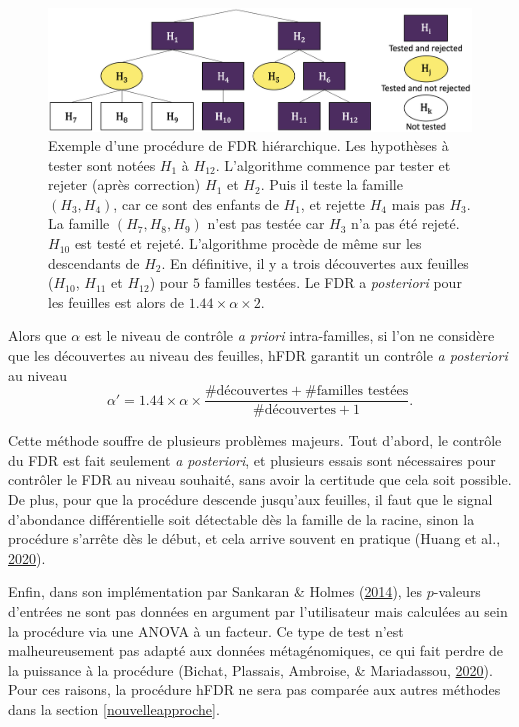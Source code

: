 \documentclass[12pt,a4paper]{reedthesis}
\theoremstyle{definition}
\theoremstyle{definition}
\theoremstyle{definition}
\theoremstyle{remark}
\begin{document}
\begin{figure}

{\centering \includegraphics[width=0.9\linewidth]{img/hfdr} 

}

\caption{Exemple d'une procédure de FDR hiérarchique. Les hypothèses à tester sont notées \(H_1\) à \(H_{12}\). L'algorithme commence par tester et rejeter (après correction) \(H_1\) et \(H_2\). Puis il teste la famille \((H_3, H_4)\), car ce sont des enfants de \(H_1\), et rejette \(H_4\) mais pas \(H_3\). La famille \((H_7, H_8, H_9)\) n'est pas testée car \(H_3\) n'a pas été rejeté. \(H_{10}\) est testé et rejeté. L'algorithme procède de même sur les descendants de \(H_2\). En définitive, il y a trois découvertes aux feuilles (\(H_{10}\), \(H_{11}\) et \(H_{12}\)) pour \(5\) familles testées. Le FDR a \emph{posteriori} pour les feuilles est alors de \(1.44 \times \alpha \times 2\).}\label{fig:hfdr}
\end{figure}
Alors que \(\alpha\) est le niveau de contrôle \emph{a priori} intra-familles, si l'on ne considère que les découvertes au niveau des feuilles, hFDR garantit un contrôle \emph{a posteriori} au niveau
\begin{equation*}
\alpha' = 1.44 \times \alpha \times \frac{\# \text{découvertes} + \#\text{familles testées}}{\# \text{découvertes} + 1}.
\end{equation*}
\newline

Cette méthode souffre de plusieurs problèmes majeurs. Tout d'abord, le contrôle du FDR est fait seulement \emph{a posteriori}, et plusieurs essais sont nécessaires pour contrôler le FDR au niveau souhaité, sans avoir la certitude que cela soit possible.
De plus, pour que la procédure descende jusqu'aux feuilles, il faut que le signal d'abondance différentielle soit détectable dès la famille de la racine, sinon la procédure s'arrête dès le début, et cela arrive souvent en pratique (Huang et al., \protect\hyperlink{ref-huang2020treeclimbr}{2020}).

Enfin, dans son implémentation par Sankaran \& Holmes (\protect\hyperlink{ref-sankaran2014structssi}{2014}), les \(p\)-valeurs d'entrées ne sont pas données en argument par l'utilisateur mais calculées au sein la procédure via une ANOVA à un facteur. Ce type de test n'est malheureusement pas adapté aux données métagénomiques, ce qui fait perdre de la puissance à la procédure (Bichat, Plassais, Ambroise, \& Mariadassou, \protect\hyperlink{ref-bichat2020incorporating}{2020}). Pour ces raisons, la procédure hFDR ne sera pas comparée aux autres méthodes dans la section \ref{nouvelleapproche}.
\end{document}
